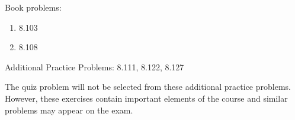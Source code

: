 
Book problems:
\begin{enumerate}
  \item 8.103
  \item 8.108
\end{enumerate}

Additional Practice Problems: 8.111, 8.122, 8.127

\noindent The quiz problem will not be selected from these additional practice problems.  However, these exercises contain important elements of the course and similar problems may appear on the exam.

\iftoggle{flagSoln}{%
\vspace{.5cm}
\rule{\textwidth}{.4pt}
\vspace{.5cm}
\textbf{Solution:}
\begin{enumerate}
  \item[8.103] 2.34 ft.
  \item[8.108 ] $\mu_s e^{\mu_s \pi/2} = 1$ solved numerically: $\mu_s = 0.475$
\end{enumerate}
}{%
}%
